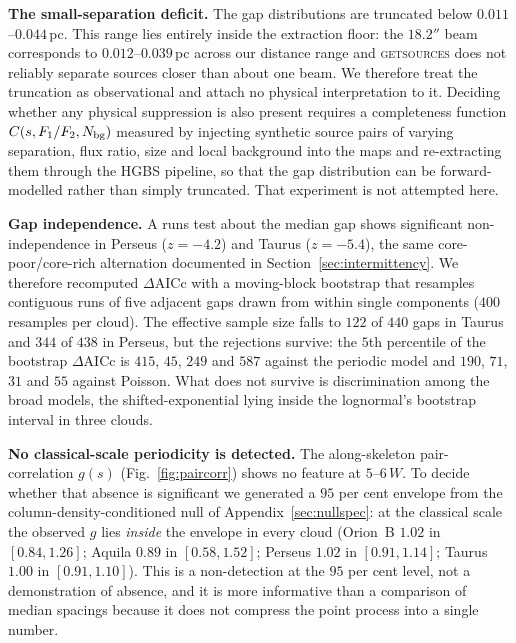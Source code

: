 \documentclass[usenatbib,twoside,twocolumn]{mnras}
\begin{document}
\smallskip\noindent\textbf{The small-separation deficit.} The gap distributions are truncated below $0.011$--$0.044$\,pc. This range lies entirely inside the extraction floor: the $18.2''$ beam corresponds to $0.012$--$0.039$\,pc across our distance range and \textsc{getsources} does not reliably separate sources closer than about one beam. We therefore treat the truncation as observational and attach no physical interpretation to it. Deciding whether any physical suppression is also present requires a completeness function $C(s,F_1/F_2,N_{\rm bg})$ measured by injecting synthetic source pairs of varying separation, flux ratio, size and local background into the maps and re-extracting them through the HGBS pipeline, so that the gap distribution can be forward-modelled rather than simply truncated. That experiment is not attempted here.

\smallskip\noindent\textbf{Gap independence.} A runs test about the median gap shows significant non-independence in Perseus ($z=-4.2$) and Taurus ($z=-5.4$), the same core-poor/core-rich alternation documented in Section~\ref{sec:intermittency}. We therefore recomputed $\Delta$AICc with a moving-block bootstrap that resamples contiguous runs of five adjacent gaps drawn from within single components ($400$ resamples per cloud). The effective sample size falls to $122$ of $440$ gaps in Taurus and $344$ of $438$ in Perseus, but the rejections survive: the $5$th percentile of the bootstrap $\Delta$AICc is $415$, $45$, $249$ and $587$ against the periodic model and $190$, $71$, $31$ and $55$ against Poisson. What does not survive is discrimination among the broad models, the shifted-exponential lying inside the lognormal's bootstrap interval in three clouds.

\smallskip\noindent\textbf{No classical-scale periodicity is detected.} The along-skeleton pair-correlation $g(s)$ (Fig.~\ref{fig:paircorr}) shows no feature at $5$--$6\,W$. To decide whether that absence is significant we generated a $95$ per cent envelope from the column-density-conditioned null of Appendix~\ref{sec:nullspec}: at the classical scale the observed $g$ lies \emph{inside} the envelope in every cloud (Orion~B $1.02$ in $[0.84,1.26]$; Aquila $0.89$ in $[0.58,1.52]$; Perseus $1.02$ in $[0.91,1.14]$; Taurus $1.00$ in $[0.91,1.10]$). This is a non-detection at the $95$ per cent level, not a demonstration of absence, and it is more informative than a comparison of median spacings because it does not compress the point process into a single number.
\end{document}
